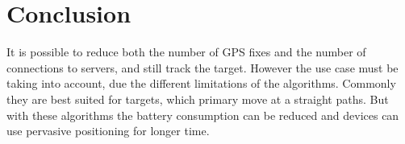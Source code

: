 \section{Conclusion}
It is possible to reduce both the number of GPS fixes and the number of connections to servers, and still track the target. However the use case must be taking into account, due the different limitations of the algorithms. Commonly they are best suited for targets, which primary move at a straight paths. But with these algorithms the battery consumption can be reduced and devices can use pervasive positioning for longer time.